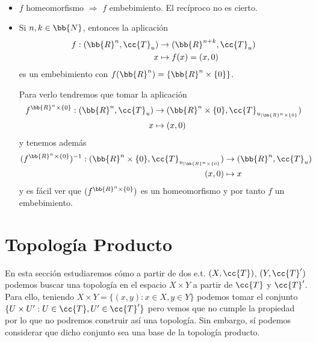 \begin{ejemplo}\
    \begin{itemize}
        \item $f$ homeomorfismo $\Rightarrow$ $f$ embebimiento. El recíproco no es cierto.
        \item Si $n, k \in \bb{N}$, entonces la aplicación 
        \begin{align*}
            f:(\bb{R}^n, \cc{T}_u)&\to (\bb{R}^{n+k}, \cc{T}_u)\\
            x &\mapsto f(x)=(x,0)
        \end{align*}
        es un embebimiento con $f(\bb{R}^n)=\{\bb{R}^n \times \{0\}\}$.

        Para verlo tendremos que tomar la aplicación 
        \begin{align*}
            f^{\bb{R}^n\times \{0\}}:(\bb{R}^n, \cc{T}_u)&\to (\bb{R}^n\times \{0\}, \cc{T}_{u_{|\bb{R}^n\times \{0\}}})\\
            x &\mapsto (x,0)
        \end{align*}
        y tenemos además
        \begin{align*}
            (f^{\bb{R}^n\times \{0\}})^{-1}:(\bb{R}^n\times \{0\}, \cc{T}_{u_{|\bb{R}^n\times \{0\}}})&\to (\bb{R}^n, \cc{T}_u)\\
            (x,0) &\mapsto x
        \end{align*}
        y es fácil ver que $(f^{\bb{R}^n\times \{0\}})$ es un homeomorfismo y por tanto $f$ un embebimiento.
    \end{itemize}
    \endsquare
\end{ejemplo}

\section{Topología Producto}
En esta sección estudiaremos cómo a partir de dos e.t. $(X, \cc{T})$, $(Y, \cc{T}')$ podemos buscar una topología en el espacio $X\times Y$ a partir de $\cc{T}$ y $\cc{T}'$. Para ello, teniendo $X\times Y=\{(x,y):x\in X, y \in Y\}$ podemos tomar el conjunto $\{U\times U' : U\in \cc{T}, U'\in \cc{T}'\}$ pero vemos que no cumple la propiedad  por lo que no podremos construir así una topología. Sin embargo, sí podemos considerar que dicho conjunto sea una base de la topología producto.

